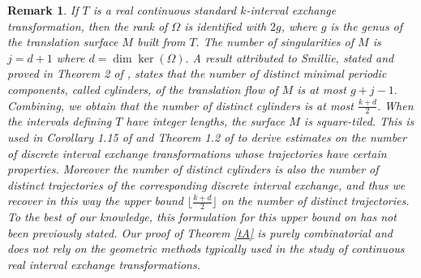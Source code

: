 \documentclass[12pt,a4paper]{amsart}
\newtheorem{corollary}{Corollary}
\newtheorem{remark}{Remark}
\begin{document}
 \begin{remark}\rm If $T$ is a real continuous standard $k$-interval exchange transformation, then the rank of  $\Omega$ is identified with $2g$, where $g$ is the genus of the translation surface $M$  built from $T.$ %
The number of singularities of $M$ is $j=d +1$ where $d=\dim \ker (\Omega).$     A  result attributed to Smillie, stated and proved in Theorem 2 of \cite{nav}, states that the number of distinct minimal periodic components, called {\it cylinders}, of the translation flow of $M$ is at most $g+j-1.$  Combining, we obtain that the number of distinct cylinders is at most $\frac{k+d}{2}.$  When the intervals defining $T$ have integer lengths, the surface $M$ is {\it square-tiled}. This is used in Corollary 1.15 of \cite{z1} and Theorem 1.2 of \cite{z2} to derive estimates on the number of discrete interval exchange transformations whose trajectories have certain properties. Moreover the number of distinct cylinders is also the number of distinct trajectories of the corresponding discrete interval exchange, and thus we recover in this way the upper bound  $\lfloor \frac {k+d}{2} \rfloor$ on the number of distinct trajectories. To the best of our knowledge, this formulation for this upper bound on has not been previously stated. Our proof of Theorem \ref{tA} is purely combinatorial and does not rely on the  geometric methods typically used in the study of continuous real interval exchange transformations.  
\end{remark}


\end{document}
